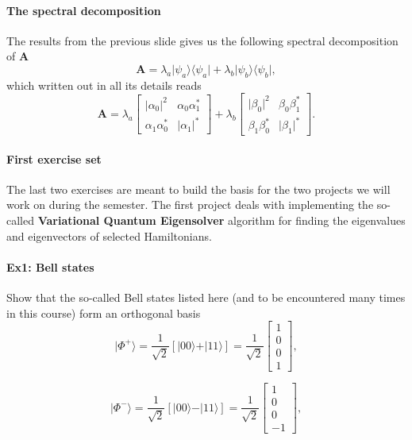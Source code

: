 \paragraph{The spectral decomposition}
The results from the previous slide gives us
the following spectral decomposition of $\bm{A}$
\[
\bm{A}=\lambda_a \vert \psi_a\rangle \langle \psi_a\vert+\lambda_b \vert \psi_b\rangle \langle \psi_b\vert,
\]
which written out in all its details reads
\[
\bm{A}=\lambda_a\begin{bmatrix} \vert \alpha_0\vert^2 &\alpha_0\alpha_1^* \\
                                                                   \alpha_1\alpha_0^* & \vert \alpha_1\vert^* \end{bmatrix} +\lambda_b\begin{bmatrix} \vert \beta_0\vert^2 &\beta_0\beta_1^* \\
                                                                   \beta_1\beta_0^* & \vert \beta_1\vert^* \end{bmatrix}.
\]


\paragraph{First exercise set}

The last two exercises are meant to build the basis for
the two projects we will work on during the semester.  The first
project deals with implementing the so-called
\textbf{Variational Quantum Eigensolver} algorithm for finding the eigenvalues and eigenvectors of selected Hamiltonians.


\paragraph{Ex1: Bell states}

Show that the so-called Bell states listed here (and to be encountered many times in this course) form an orthogonal basis
\[
\vert \Phi^+\rangle = \frac{1}{\sqrt{2}}\left[\vert 00\rangle +\vert 11\rangle\right]=\frac{1}{\sqrt{2}}\begin{bmatrix} 1 \\ 0 \\ 0 \\ 1\end{bmatrix},
\]

\[
\vert \Phi^-\rangle = \frac{1}{\sqrt{2}}\left[\vert 00\rangle -\vert 11\rangle\right]=\frac{1}{\sqrt{2}}\begin{bmatrix} 1 \\ 0 \\ 0 \\ -1\end{bmatrix},
\]


